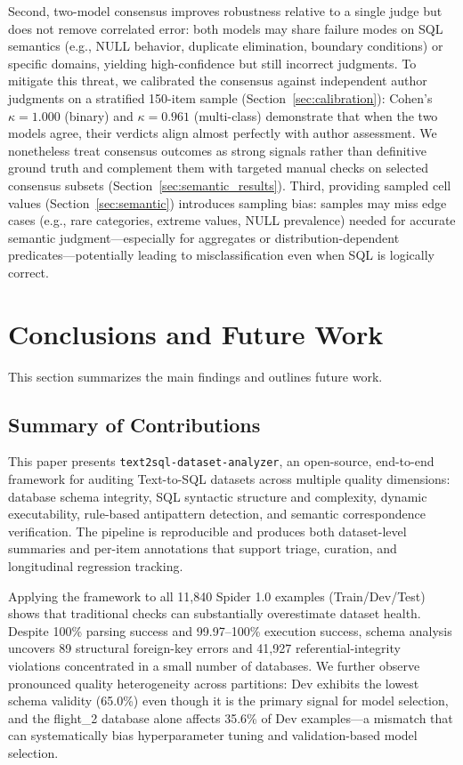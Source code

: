 \documentclass[print]{einformatica}
\begin{document}
Second, two-model consensus improves robustness relative to a single judge but does not remove correlated error: both models may share failure modes on SQL semantics (e.g., NULL behavior, duplicate elimination, boundary conditions) or specific domains, yielding high-confidence but still incorrect judgments. To mitigate this threat, we calibrated the consensus against independent author judgments on a stratified 150-item sample (Section~\ref{sec:calibration}): Cohen's $\kappa = 1.000$ (binary) and $\kappa = 0.961$ (multi-class) demonstrate that when the two models agree, their verdicts align almost perfectly with author assessment. We nonetheless treat consensus outcomes as strong signals rather than definitive ground truth and complement them with targeted manual checks on selected consensus subsets (Section~\ref{sec:semantic_results}). Third, providing sampled cell values (Section~\ref{sec:semantic}) introduces sampling bias: samples may miss edge cases (e.g., rare categories, extreme values, NULL prevalence) needed for accurate semantic judgment---especially for aggregates or distribution-dependent predicates---potentially leading to misclassification even when SQL is logically correct.

\section{Conclusions and Future Work}\label{sec:Conclusions}

This section summarizes the main findings and outlines future work.

\subsection{Summary of Contributions}

This paper presents \texttt{text2sql-dataset-analyzer}, an open-source, end-to-end framework for auditing Text-to-SQL datasets across multiple quality dimensions: database schema integrity, SQL syntactic structure and complexity, dynamic executability, rule-based antipattern detection, and semantic correspondence verification. The pipeline is reproducible and produces both dataset-level summaries and per-item annotations that support triage, curation, and longitudinal regression tracking.

Applying the framework to all 11,840 Spider 1.0 examples (Train/Dev/Test) shows that traditional checks can substantially overestimate dataset health. Despite 100\% parsing success and 99.97--100\% execution success, schema analysis uncovers 89 structural foreign-key errors and 41,927 referential-integrity violations concentrated in a small number of databases. We further observe pronounced quality heterogeneity across partitions: Dev exhibits the lowest schema validity (65.0\%) even though it is the primary signal for model selection, and the flight\_2 database alone affects 35.6\% of Dev examples---a mismatch that can systematically bias hyperparameter tuning and validation-based model selection.
\end{document}
